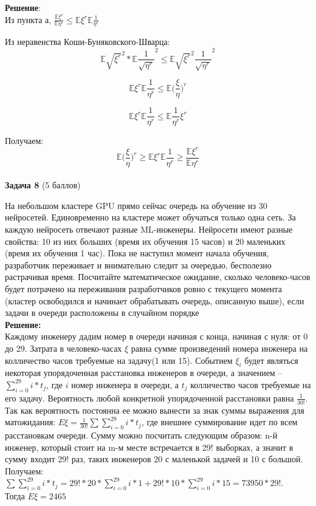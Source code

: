 \documentclass{article}
\begin{document}
\textbf{Решение}:\\

Из пункта а, $\frac{\mathbb{E}\xi^r}{\mathbb{E}\eta^r} \leq \mathbb{E}\xi^r\mathbb{E}\frac{1}{\eta^r}$

Из неравенства Коши-Буняковского-Шварца: $$\mathbb{E}\sqrt{\xi^r}^2*\mathbb{E}\frac{1}{\sqrt{\eta^r}}^2 \leq \mathbb{E}\sqrt{\xi^r}^2\frac{1}{\sqrt{\eta^r}}^2$$

$$\mathbb{E}\xi^r\mathbb{E}\frac{1}{\eta^r} \leq \mathbb{E}\Big(\frac{\xi}{\eta}\Big)^r$$
 
$$\mathbb{E}\xi^r\mathbb{E}\frac{1}{\eta^r} \leq \mathbb{E}\frac{1}{\eta^r}\xi^r$$

Получаем: $$ \mathbb{E}\Big(\frac{\xi}{\eta}\Big)^r\geq \mathbb{E}\xi^r\mathbb{E}\frac{1}{\eta^r} \geq \frac{\mathbb{E}\xi^r}{\mathbb{E}\eta^r}$$\\

\textbf{Задача 8} (5 баллов)

На небольшом кластере GPU прямо сейчас очередь на обучение из 30 нейросетей. Единовременно на кластере может обучаться только одна сеть. За каждую нейросеть отвечают разные ML-инженеры. Нейросети имеют разные свойства: 10 из них больших (время их обучения 15 часов) и 20 маленьких (время их обучения 1 час). Пока не наступил момент начала обучения, разработчик переживает и внимательно следит за очередью, бесполезно растрачивая время. Посчитайте математическое ожидание, сколько человеко-часов будет потрачено на переживания разработчиков ровно с текущего момента (кластер освободился и начинает обрабатывать очередь, описанную выше), если задачи в очереди расположены в случайном порядке\\

\textbf{Решение:}\\

Каждому инженеру дадим номер в очереди начиная с конца, начиная с нуля: от 0 до 29. Затрата в человеко-часах  $\xi$ равна сумме произведений номера инженера на колличество часов требуемые на задачу(1 или 15). Событием $\xi_i$ будет являться некоторая упорядоченная расстановка инженеров в очереди, а значением -- $\sum\limits_{i = 0}^{29}i*t_j$, где $i$ номер инженера в очереди,  а $t_j$ колличество часов требуемые на его задачу. Вероятность любой конкретной упорядоченной расстановки равна $\frac{1}{30!}$. Так как вероятность постоянна ее можно вынести за знак суммы выражения для матожидания: $E\xi = \frac{1}{30!}\sum\sum\limits_{i = 0}^{29}i*t_j$, где внешнее суммирование идет по всем расстановкам очереди. Сумму можно посчитать следующим образом: n-й инженер, который стоит на m-м месте встречается в 29! выборках, а значит в сумму входит 29! раз, таких инженеров 20 с маленькой задачей и 10 с большой. Получаем: $\sum\sum\limits_{i = 0}^{29}i*t_j = 29!*20*\sum\limits_{i = 0}^{29}i*1 + 29!*10*\sum\limits_{i = 0}^{29}i*15 = 73950*29!$.\\

Тогда $E\xi = 2465$
\end{document}

